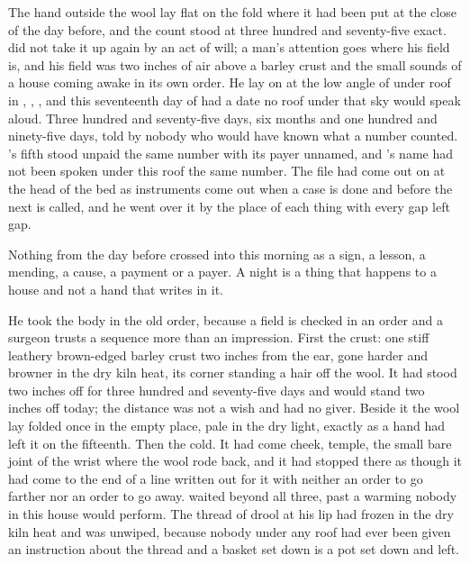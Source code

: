 
The hand outside the wool lay flat on the fold where it had been put at the close of the day before, and the count stood at three hundred and seventy-five exact.  did not take it up again by an act of will; a man's attention goes where his field is, and his field was two inches of air above a barley crust and the small sounds of a house coming awake in its own order. He lay on  at the low angle of  under  roof in , , , and this seventeenth day of  had a date no roof under that sky would speak aloud. Three hundred and seventy-five days, six months and one hundred and ninety-five days, told by nobody who would have known what a number counted. 's fifth stood unpaid the same number with its payer unnamed, and 's name had not been spoken under this roof the same number. The file had come out on  at the head of the bed as instruments come out when a case is done and before the next is called, and he went over it by the place of each thing with every gap left gap.

Nothing from the day before crossed into this morning as a sign, a lesson, a mending, a cause, a payment or a payer. A night is a thing that happens to a house and not a hand that writes in it.

He took the body in the old order, because a field is checked in an order and a surgeon trusts a sequence more than an impression. First the crust: one stiff leathery brown-edged barley crust two inches from the ear, gone harder and browner in the dry kiln heat, its corner standing a hair off the wool. It had stood two inches off for three hundred and seventy-five days and would stand two inches off today; the distance was not a wish and had no giver. Beside it the wool lay folded once in the empty place, pale in the dry light, exactly as a hand had left it on the fifteenth. Then the cold. It had come cheek, temple, the small bare joint of the wrist where the wool rode back, and it had stopped there as though it had come to the end of a line written out for it with neither an order to go farther nor an order to go away.  waited beyond all three, past a warming nobody in this house would perform. The thread of drool at his lip had frozen in the dry kiln heat and was unwiped, because nobody under any roof had ever been given an instruction about the thread and a basket set down is a pot set down and left.

